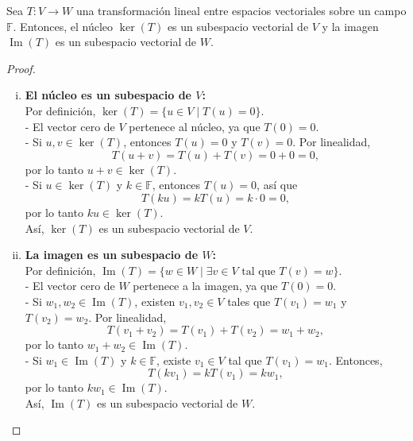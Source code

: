 \begin{theorem}
Sea $T: V \to W$ una transformación lineal entre espacios vectoriales sobre un campo $\mathbb{F}$. Entonces, el núcleo $\ker(T)$ es un subespacio vectorial de $V$ y la imagen $\operatorname{Im}(T)$ es un subespacio vectorial de $W$.
\begin{proof}
\begin{enumerate}[i.]
    \item \textbf{El núcleo es un subespacio de $V$:} \\
    Por definición, $\ker(T) = \{u \in V \mid T(u) = 0\}$.\\
    - El vector cero de $V$ pertenece al núcleo, ya que $T(0) = 0$.\\
    - Si $u, v \in \ker(T)$, entonces $T(u) = 0$ y $T(v) = 0$. Por linealidad,
    \[
    T(u + v) = T(u) + T(v) = 0 + 0 = 0,
    \]
    por lo tanto $u + v \in \ker(T)$.\\
    - Si $u \in \ker(T)$ y $k \in \mathbb{F}$, entonces $T(u) = 0$, así que
    \[
    T(k u) = k T(u) = k \cdot 0 = 0,
    \]
    por lo tanto $k u \in \ker(T)$.\\
    Así, $\ker(T)$ es un subespacio vectorial de $V$.

    \item \textbf{La imagen es un subespacio de $W$:} \\
    Por definición, $\operatorname{Im}(T) = \{w \in W \mid \exists v \in V \text{ tal que } T(v) = w\}$.\\
    - El vector cero de $W$ pertenece a la imagen, ya que $T(0) = 0$.\\
    - Si $w_1, w_2 \in \operatorname{Im}(T)$, existen $v_1, v_2 \in V$ tales que $T(v_1) = w_1$ y $T(v_2) = w_2$. Por linealidad,
    \[
    T(v_1 + v_2) = T(v_1) + T(v_2) = w_1 + w_2,
    \]
    por lo tanto $w_1 + w_2 \in \operatorname{Im}(T)$.\\
    - Si $w_1 \in \operatorname{Im}(T)$ y $k \in \mathbb{F}$, existe $v_1 \in V$ tal que $T(v_1) = w_1$. Entonces,
    \[
    T(k v_1) = k T(v_1) = k w_1,
    \]
    por lo tanto $k w_1 \in \operatorname{Im}(T)$.\\
    Así, $\operatorname{Im}(T)$ es un subespacio vectorial de $W$.
\end{enumerate}
\end{proof}
\end{theorem}

